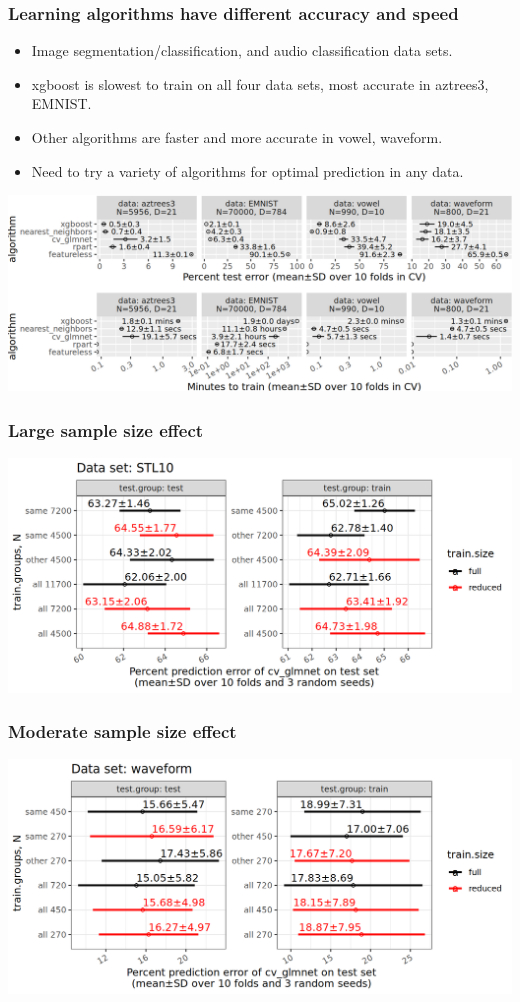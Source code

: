 \documentclass[t]{beamer}
\begin{document}
\begin{frame}
  \frametitle{Learning algorithms have different accuracy and speed}
  \begin{itemize}
  \item Image segmentation/classification, and audio classification data sets.
  \item xgboost is slowest to train on all four data sets, most accurate in aztrees3, EMNIST.
  \item Other algorithms are faster and more accurate in vowel, waveform.
  \item Need to try a variety of algorithms for optimal prediction in any data.
  \end{itemize}
  \includegraphics[width=\textwidth]{figure-2-algos-test-error-train-time}
\end{frame}


\begin{frame}
  \frametitle{Large sample size effect}
  \includegraphics[width=\textwidth]{STL10_error_glmnet_sizes_mean_sd_more}
\end{frame}

\begin{frame}
  \frametitle{Moderate sample size effect}
  \includegraphics[width=\textwidth]{waveform_error_glmnet_sizes_mean_sd_more}
\end{frame}
\end{document}

